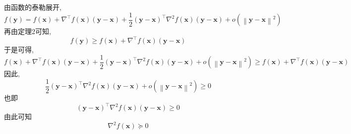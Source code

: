 由函数的泰勒展开,
$$
f\left( \boldsymbol{y} \right) =f\left( \boldsymbol{x} \right) +\nabla ^{\top}f\left( \boldsymbol{x} \right) \left( \boldsymbol{y}-\boldsymbol{x} \right) +\frac{1}{2}\left( \boldsymbol{y}-\boldsymbol{x} \right) ^{\top}\nabla ^2f\left( \boldsymbol{x} \right) \left( \boldsymbol{y}-\boldsymbol{x} \right) +o\left( \left\| \boldsymbol{y}-\boldsymbol{x} \right\| ^2 \right)~
$$
再由定理2可知,
$$
f\left( \boldsymbol{y} \right) \geqslant f\left( \boldsymbol{x} \right) +\nabla ^{\top}f\left( \boldsymbol{x} \right) \left( \boldsymbol{y}-\boldsymbol{x} \right)~
$$
于是可得,
$$
f\left( \boldsymbol{x} \right) +\nabla ^{\top}f\left( \boldsymbol{x} \right) \left( \boldsymbol{y}-\boldsymbol{x} \right) +\frac{1}{2}\left( \boldsymbol{y}-\boldsymbol{x} \right) ^{\top}\nabla ^2f\left( \boldsymbol{x} \right) \left( \boldsymbol{y}-\boldsymbol{x} \right) +o\left( \left\| \boldsymbol{y}-\boldsymbol{x} \right\| ^2 \right) \geqslant f\left( \boldsymbol{x} \right) +\nabla ^{\top}f\left( \boldsymbol{x} \right) \left( \boldsymbol{y}-\boldsymbol{x} \right)~
$$
因此,
$$
\frac{1}{2}\left( \boldsymbol{y}-\boldsymbol{x} \right) ^{\top}\nabla ^2f\left( \boldsymbol{x} \right) \left( \boldsymbol{y}-\boldsymbol{x} \right) +o\left( \left\| \boldsymbol{y}-\boldsymbol{x} \right\| ^2 \right) \geqslant 0~
$$
也即
$$
\left( \boldsymbol{y}-\boldsymbol{x} \right) ^{\top}\nabla ^2f\left( \boldsymbol{x} \right) \left( \boldsymbol{y}-\boldsymbol{x} \right) \geqslant 0~
$$
由此可知
$$
\nabla ^2f\left( \boldsymbol{x} \right) \succeq 0~
$$